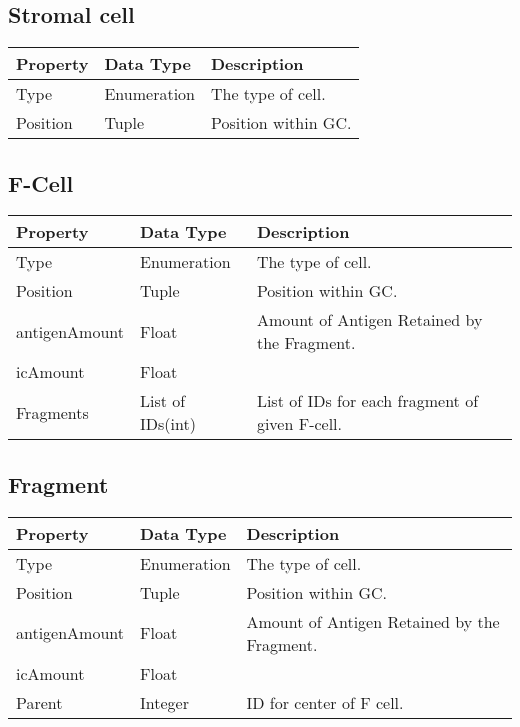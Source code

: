 \documentclass[english]{article}
\begin{document}
\subsection{Stromal cell}
\begin{center}
\begin{tabular}{|C{2.1in}|C{2.1in}|C{2.1in}|}
\hline
\textbf{Property} & \textbf{Data Type} & \textbf{Description}
\tabularnewline
\hline
\hline
Type & Enumeration & The type of cell. 
\tabularnewline
\hline
Position & Tuple & Position within GC.
\tabularnewline
\hline

\end{tabular}
\end{center}

\subsection{F-Cell}
\begin{center}
\begin{tabular}{|C{2.1in}|C{2.1in}|C{2.1in}|}

\hline
\textbf{Property} & \textbf{Data Type} & \textbf{Description}
\tabularnewline
\hline
\hline
Type & Enumeration & The type of cell. 
\tabularnewline
\hline
Position & Tuple & Position within GC.
\tabularnewline
\hline
antigenAmount & Float & Amount of Antigen Retained by the Fragment. 
\tabularnewline
\hline
icAmount & Float &
\tabularnewline
\hline
Fragments & List of IDs(int) & List of IDs for each fragment of given F-cell. 
\tabularnewline
\hline

\end{tabular}
\end{center}

\subsection{Fragment}
\begin{center}
\begin{tabular}{|C{2.1in}|C{2.1in}|C{2.1in}|}

\hline
\textbf{Property} & \textbf{Data Type} & \textbf{Description}
\tabularnewline
\hline
\hline
Type & Enumeration & The type of cell. 
\tabularnewline
\hline
Position & Tuple & Position within GC.
\tabularnewline
\hline
antigenAmount & Float & Amount of Antigen Retained by the Fragment. 
\tabularnewline
\hline
icAmount & Float &
\tabularnewline
\hline 
Parent & Integer & ID for center of F cell.  
\tabularnewline
\hline

\end{tabular}
\end{center}
\end{document}
